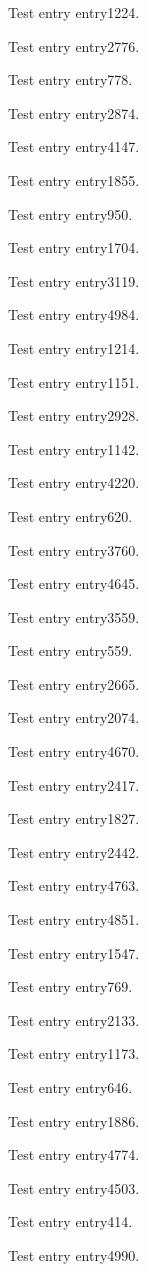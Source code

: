Test entry \gls{entry1224}.

Test entry \gls{entry2776}.

Test entry \gls{entry778}.

Test entry \gls{entry2874}.

Test entry \gls{entry4147}.

Test entry \gls{entry1855}.

Test entry \gls{entry950}.

Test entry \gls{entry1704}.

Test entry \gls{entry3119}.

Test entry \gls{entry4984}.

Test entry \gls{entry1214}.

Test entry \gls{entry1151}.

Test entry \gls{entry2928}.

Test entry \gls{entry1142}.

Test entry \gls{entry4220}.

Test entry \gls{entry620}.

Test entry \gls{entry3760}.

Test entry \gls{entry4645}.

Test entry \gls{entry3559}.

Test entry \gls{entry559}.

Test entry \gls{entry2665}.

Test entry \gls{entry2074}.

Test entry \gls{entry4670}.

Test entry \gls{entry2417}.

Test entry \gls{entry1827}.

Test entry \gls{entry2442}.

Test entry \gls{entry4763}.

Test entry \gls{entry4851}.

Test entry \gls{entry1547}.

Test entry \gls{entry769}.

Test entry \gls{entry2133}.

Test entry \gls{entry1173}.

Test entry \gls{entry646}.

Test entry \gls{entry1886}.

Test entry \gls{entry4774}.

Test entry \gls{entry4503}.

Test entry \gls{entry414}.

Test entry \gls{entry4990}.

